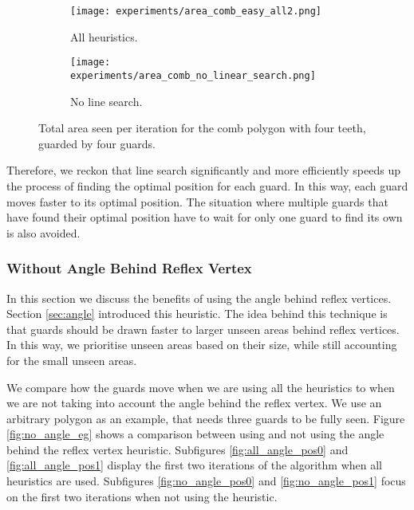 \begin{figure}[h!]
    \centering
    \begin{subfigure}{0.45\textwidth}
        \texttt{[image: experiments/area\_comb\_easy\_all2.png]}
        \caption{All heuristics.}
        \label{fig:no_line_search1}
    \end{subfigure}
    \hfill
    \begin{subfigure}{0.45\textwidth}
        \texttt{[image: experiments/area\_comb\_no\_linear\_search.png]}
        \caption{No line search.}
        \label{fig:no_line_search2}
    \end{subfigure}
    \caption{Total area seen per iteration for the comb polygon with four teeth, guarded by four guards.}
    \label{fig:no_line_search}
\end{figure}

Therefore, we reckon that line search significantly and more efficiently speeds up the process of finding the optimal position for each guard. In this way, each guard moves faster to its optimal position. The situation where multiple guards that have found their optimal position have to wait for only one guard to find its own is also avoided.

\subsubsection{Without Angle Behind Reflex Vertex}
In this section we  discuss the benefits of using the angle behind reflex vertices. Section \ref{sec:angle} introduced this heuristic. The idea behind this technique is that guards should be drawn faster to larger unseen areas behind reflex vertices. 
In this way, we prioritise unseen areas based on their size, while still accounting for the small unseen areas.

We  compare how the guards move when we are using all the heuristics to when we are not taking into account the angle behind the reflex vertex. We  use an arbitrary polygon as an example, that needs three guards to be fully seen. Figure \ref{fig:no_angle_eg} shows a comparison between using and not using the angle behind the reflex vertex heuristic. Subfigures \ref{fig:all_angle_pos0} and \ref{fig:all_angle_pos1} display the first two iterations of the algorithm when all heuristics are used. Subfigures \ref{fig:no_angle_pos0} and \ref{fig:no_angle_pos1} focus on the first two iterations when not using the heuristic.

